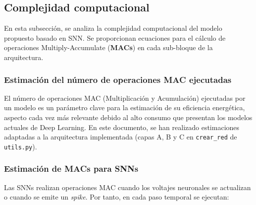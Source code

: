 
    
\subsection{Complejidad computacional}

En esta subsección, se analiza la complejidad computacional del modelo propuesto basado en SNN. Se proporcionan ecuaciones para el cálculo de operaciones Multiply-Accumulate (\textbf{MACs}) en cada sub-bloque de la arquitectura.

\subsubsection{Estimación del número de operaciones MAC ejecutadas}

El número de operaciones MAC (Multiplicación y Acumulación) ejecutadas por un modelo es un parámetro clave para la estimación de su eficiencia energética, aspecto cada vez más relevante debido al alto consumo que presentan los modelos actuales de Deep Learning. En este documento, se han realizado estimaciones adaptadas a la arquitectura implementada (capas A, B y C en \texttt{crear\_red} de \texttt{utils.py}).

\subsubsection{Estimación de MACs para SNNs}

Las SNNs realizan operaciones MAC cuando los voltajes neuronales se actualizan o cuando se emite un \textit{spike}. Por tanto, en cada paso temporal se ejecutan:

